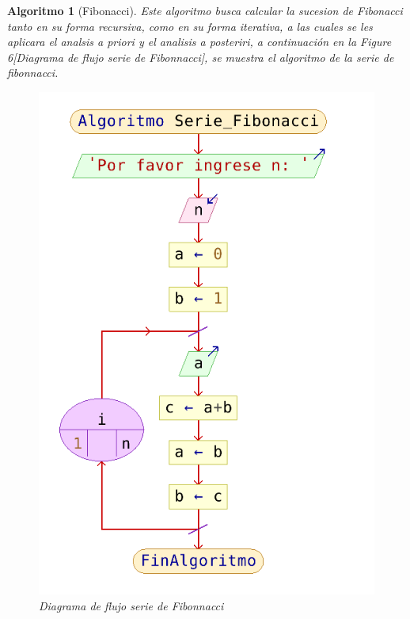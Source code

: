 \documentclass[12pt,twoside]{article}
\newtheorem{algoritmo}{Algoritmo}
\begin{document}
\begin{algoritmo}[Fibonacci]
Este algoritmo busca calcular la sucesion de Fibonacci tanto en su forma recursiva, como en su forma iterativa, a las cuales se les aplicara el analsis a priori y el analisis a posteriri, a continuación en la Figure 6[Diagrama de flujo serie de Fibonnacci], se muestra el algoritmo de la serie de fibonnacci.

\begin{figure}[h!]
\centering
\includegraphics[scale=0.3]{fibonn.png}
\caption{Diagrama de flujo serie de Fibonnacci}
\label{fig:universe}
\end{figure}

\end{algoritmo}
\end{document}
